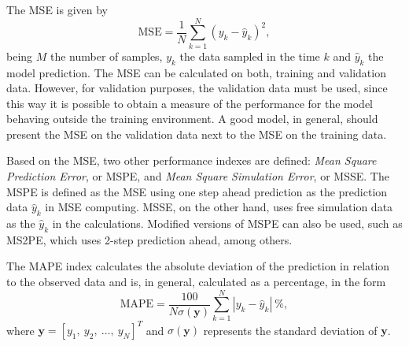 The MSE is given by
\begin{equation}
   \label{eq:MSE}
   \text{MSE} = \frac{1}{N}\sum_{k=1}^{N}(y_k-\hat{y}_k)^2,
\end{equation}
being $M$ the number of samples, $y_k$ the data sampled in the time $k$ and $\hat{y}_k$ the model prediction. The MSE can be calculated on both, training and validation data. However, for validation purposes, the validation data must be used, since this way it is possible to obtain a measure of the performance for the model behaving outside the training environment. A good model, in general, should present the MSE on the validation data next to the MSE on the training data.

Based on the MSE, two other performance indexes are defined: \textit{Mean Square Prediction Error}, or MSPE, and \textit{Mean Square Simulation Error}, or MSSE.
The MSPE is defined as the MSE using one step ahead prediction as the prediction data $\hat{y}_k$ in MSE computing. MSSE, on the other hand, uses free simulation data as the $\hat{y}_k$ in the calculations. Modified versions of MSPE can also be used, such as MS2PE, which uses 2-step prediction ahead, among others.

The MAPE index calculates the absolute deviation of the prediction in relation to the observed data and is, in general, calculated as a percentage, in the form
\begin{equation}
   \label{eq:MAPE}
   \text{MAPE} =  \frac{100}{N{\sigma(\bm{y})}}\sum_{k=1}^{N} {|y_k - \hat{y}_k|}\ \%, %
\end{equation}
where $\bm{y}=[y_1,\ y_2,\ \dots,\ y_N]^T$ and $\sigma(\bm{y})$ represents the standard deviation of $\bm{y}$.

